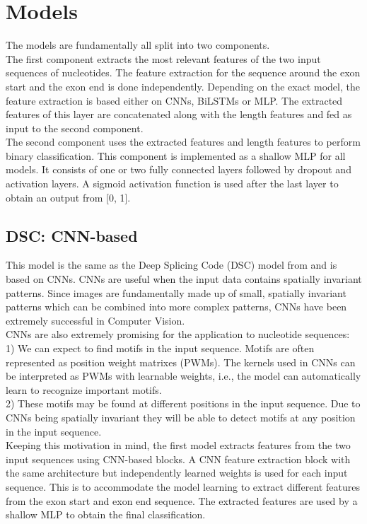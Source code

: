 \section{Models} \label{sec:models}
The models are fundamentally all split into two components. \\
The first component extracts the most relevant features of the two input sequences of nucleotides. The feature extraction for the sequence around the exon start and the exon end is done independently. Depending on the exact model, the feature extraction is based either on CNNs, BiLSTMs or MLP. The extracted features of this layer are concatenated along with the length features and fed as input to the second component.\\
The second component uses the extracted features and length features to perform binary classification. This component is implemented as a shallow MLP for all models. It consists of one or two fully connected layers followed by dropout and activation layers. A sigmoid activation function is used after the last layer to obtain an output from [0, 1].
\subsection{DSC: CNN-based} \label{subsec:dsc}
This model is the same as the Deep Splicing Code (DSC) model from \cite{dsc} and is based on CNNs.
CNNs are useful when the input data contains spatially invariant patterns. Since images are fundamentally made up of small, spatially invariant patterns which can be combined into more complex patterns, CNNs have been extremely successful in Computer Vision.\\
CNNs are also extremely promising for the application to nucleotide sequences: \\
1) We can expect to find motifs in the input sequence. Motifs are often represented as position weight matrixes (PWMs). The kernels used in CNNs can be interpreted as PWMs with learnable weights, i.e., the model can automatically learn to recognize important motifs.\\
2) These motifs may be found at different positions in the input sequence. Due to CNNs being spatially invariant they will be able to detect motifs at any position in the input sequence. \\
Keeping this motivation in mind, the first model extracts features from the two input sequences using CNN-based blocks. A CNN feature extraction block with the same architecture but independently learned weights is used for each input sequence. This is to accommodate the model learning to extract different features from the exon start and exon end sequence. The extracted features are used by a shallow MLP to obtain the final classification. 

